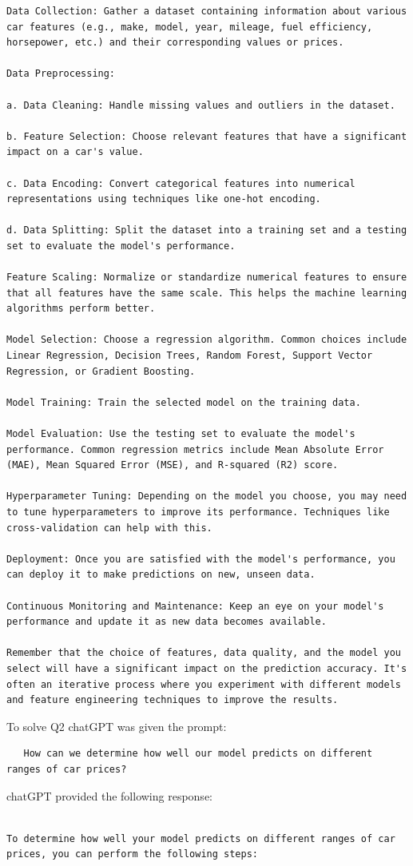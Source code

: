 \documentclass{article}
\begin{document}
\begin{titlepage}
\begin{verbatim}
Data Collection: Gather a dataset containing information about various car features (e.g., make, model, year, mileage, fuel efficiency, horsepower, etc.) and their corresponding values or prices.

Data Preprocessing:

a. Data Cleaning: Handle missing values and outliers in the dataset.

b. Feature Selection: Choose relevant features that have a significant impact on a car's value.

c. Data Encoding: Convert categorical features into numerical representations using techniques like one-hot encoding.

d. Data Splitting: Split the dataset into a training set and a testing set to evaluate the model's performance.

Feature Scaling: Normalize or standardize numerical features to ensure that all features have the same scale. This helps the machine learning algorithms perform better.

Model Selection: Choose a regression algorithm. Common choices include Linear Regression, Decision Trees, Random Forest, Support Vector Regression, or Gradient Boosting.

Model Training: Train the selected model on the training data.

Model Evaluation: Use the testing set to evaluate the model's performance. Common regression metrics include Mean Absolute Error (MAE), Mean Squared Error (MSE), and R-squared (R2) score.

Hyperparameter Tuning: Depending on the model you choose, you may need to tune hyperparameters to improve its performance. Techniques like cross-validation can help with this.

Deployment: Once you are satisfied with the model's performance, you can deploy it to make predictions on new, unseen data.

Continuous Monitoring and Maintenance: Keep an eye on your model's performance and update it as new data becomes available.

Remember that the choice of features, data quality, and the model you select will have a significant impact on the prediction accuracy. It's often an iterative process where you experiment with different models and feature engineering techniques to improve the results.
\end{verbatim}
\newpage
To solve Q2 chatGPT was given the prompt:
\begin{verbatim}
   How can we determine how well our model predicts on different ranges of car prices?
\end{verbatim}
chatGPT provided the following response: \\\\
\begin{verbatim}
To determine how well your model predicts on different ranges of car prices, you can perform the following steps:


\end{verbatim}
\end{titlepage}
\end{document}
